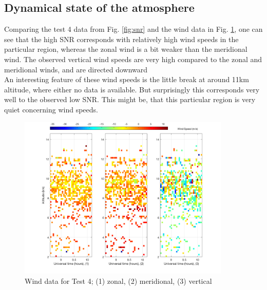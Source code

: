 \subsection{Dynamical state of the atmosphere}
Comparing the test 4 data from Fig. \ref{fig:snr} and the wind data in Fig. \ref{fig:windPlot}, one can see that the high SNR corresponds with relatively high wind speeds in the particular region, whereas the zonal wind is a bit weaker than the meridional wind. The observed vertical wind speeds are very high compared to the zonal and meridional winds, and are directed downward \\
An interesting feature of these wind speeds is the little break at around 11km altitude, where either no data is available. But surprisingly this corresponds very well to the observed low SNR. This might be, that this particular region is very quiet concerning wind speeds.
\begin{figure}[h!]
	\centering
	\includegraphics[width=0.9\textwidth]{images/task2_wind_plot}
	\caption{Wind data for Test 4; (1) zonal, (2) meridional, (3) vertical}
	\label{fig:windPlot}
\end{figure}









